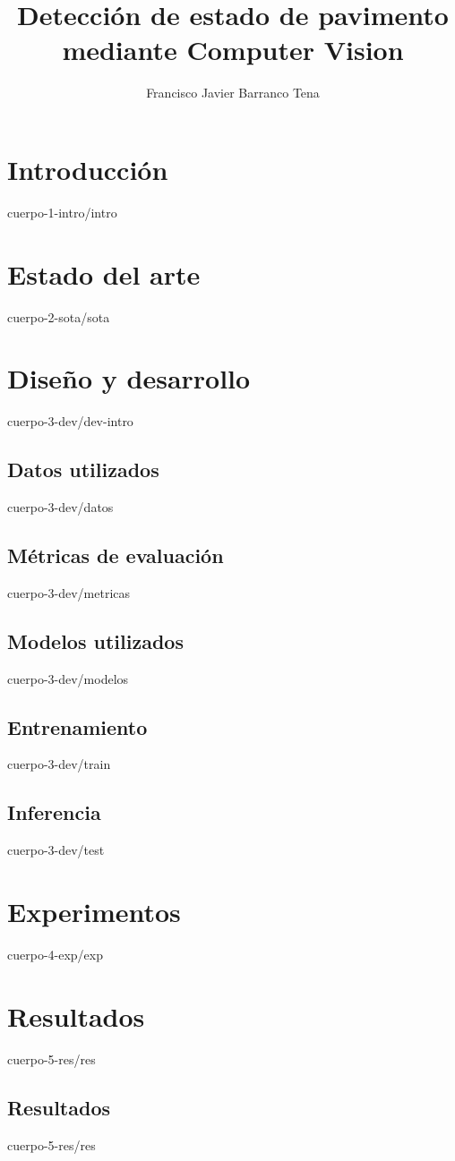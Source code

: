 \documentclass[epsbased,copyright,final,printable,covers,extendedindex,firstnumbered,tfg,gnuplot]{tfgtfmthesisuam}
\title{Detección de estado de pavimento mediante Computer Vision}
\subtitle{}
\author{Francisco Javier Barranco Tena}
\begin{document}
\chapter{Introducción\label{CAP:INTRO}}{cuerpo-1-intro/intro}

\chapter{Estado del arte\label{CAP:SOTA}}{cuerpo-2-sota/sota}

\chapter{Diseño y desarrollo\label{CAP:DEV}}{cuerpo-3-dev/dev-intro}
  \section{Datos utilizados\label{SEC:DATOS}}{cuerpo-3-dev/datos}
  \section{Métricas de evaluación\label{SEC:METRICAS}}{cuerpo-3-dev/metricas}
  \section{Modelos utilizados\label{SEC:MODELOS}}{cuerpo-3-dev/modelos}
  \section{Entrenamiento\label{SEC:TRAIN}}{cuerpo-3-dev/train}
  \section{Inferencia\label{SEC:PRED}}{cuerpo-3-dev/test}
  
\chapter{Experimentos\label{CAP:EXP}}{cuerpo-4-exp/exp}

\chapter{Resultados\label{CAP:RES}}{cuerpo-5-res/res}
  \section{Resultados\label{SEC:RES_S1}}{cuerpo-5-res/res}
\end{document}
